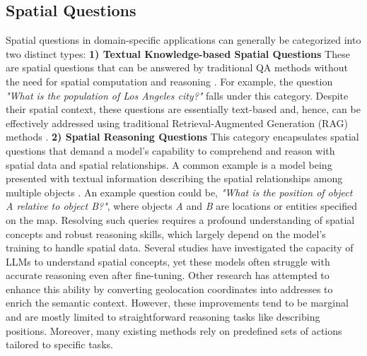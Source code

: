 \subsection{Spatial Questions}
Spatial questions in domain-specific applications can generally be categorized into two distinct types:
\textbf{1) Textual Knowledge-based Spatial Questions} These are spatial questions that can be answered by traditional QA methods without the need for spatial computation and reasoning \cite{lietard2021language}.
For example, the question \textit{"What is the population of Los Angeles city?"} falls under this category. Despite their spatial context, these questions are essentially text-based and, hence, can be effectively addressed using traditional Retrieval-Augmented Generation (RAG) methods \cite{christmann2024rag}.
\textbf{2) Spatial Reasoning Questions} This category encapsulates spatial questions that demand a model's capability to comprehend and reason with spatial data and spatial relationships. A common example is a model being presented with textual information describing the spatial relationships among multiple objects \cite{li2024advancing}. An example question could be, \textit{"What is the position of object A relative to object B?"}, where objects \textit{A} and \textit{B} are locations or entities specified on the map. Resolving such queries requires a profound understanding of spatial concepts and robust reasoning skills, which largely depend on the model’s training to handle spatial data.
Several studies  \citep{mai2024opportunities,roberts2023gpt4geo} have investigated the capacity of LLMs to understand spatial concepts, yet these models often struggle with accurate reasoning even after fine-tuning.   Other research \cite{li2023geolm} has attempted to enhance this ability by converting geolocation coordinates into addresses to enrich the semantic context.   However, these improvements tend to be marginal and are mostly limited to straightforward reasoning tasks like describing positions. Moreover, many existing methods rely on predefined sets of actions tailored to specific tasks.